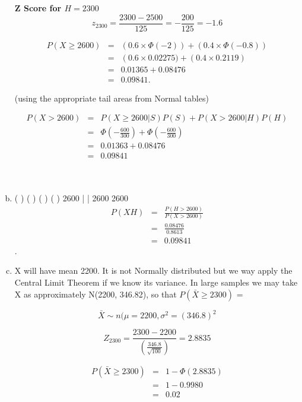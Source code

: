 \documentclass[a4paper,12pt]{article}
\begin{document}
\begin{enumerate}[(a)]
\begin{framed}
\noindent \textbf{Z Score for $H = 2300$}
\[z_{2300}  = \frac{2300 - 2500}{125}  = -\frac{200}{125} = -1.6\]
\end{framed}

\begin{eqnarray*} 
P(X \geq 2600) &=& \left(0.6 \times \Phi(-2)\right) + \left(0.4 \times \Phi(-0.8)\right)\\
&=& \left(0.6 \times 0.02275) + \left(0.4 \times 0.2119\right)\\
 &=& 0.01365 + 0.08476 \\ 
 &=& 0.09841.
\end{eqnarray*}

(using the appropriate tail areas from Normal tables)





\begin{eqnarray*}
P(X > 2600) &=& P(X \geq 2600|S)P(S) + P(X > 2600|H)P(H) \\
 &=& \Phi \left( - \frac{600}{300}\right) + \Phi \left( - \frac{600}{300}\right) \\
 &=& 0.01363 + 0.08476 \\
 &=& 0.09841 \\
\end{eqnarray*}

   
\item  ( ) ( ) ( )
( )
2600 |  | 2600 
2600 
\begin{eqnarray*}
P (X H) &=& \frac{P(H>2600)}{P(X>2600)}\\

&=& \frac{0.08476}{0.8613}\\
&=& 0.09841
\end{eqnarray*}.

\item X will have mean 2200. It is not Normally distributed but we way
apply the Central Limit Theorem if we know its variance. In large samples we
may take X as approximately N(2200, 346.82), so that $P(\bar{X}\geq 2300)$ = 
  
\[\bar{X} \sim n(\mu = 2200, \sigma^2 = (346.8)^2\]
               
 \[Z_{2300}  =   \frac{2300-2200}{       \left(\frac{346.8}{\sqrt{100}} \right)} = 2.8835\]



\begin{eqnarray*} 
P(\bar{X}\geq 2300) &=& 1- \Phi(2.8835)\\  &=& 1- 0.9980 \\&=& 0.02
\end{eqnarray*}

\end{enumerate}

  

                                              
\end{document}
